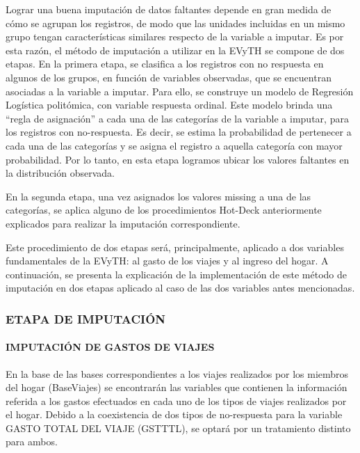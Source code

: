 \documentclass[
  openany]{book}
\begin{document}
Lograr una buena imputación de datos faltantes depende en gran medida de cómo se agrupan los registros, de modo que las unidades incluidas en un mismo grupo tengan características similares respecto de la variable a imputar. Es por esta razón, el método de imputación a utilizar en la EVyTH se compone de dos etapas. En la primera etapa, se clasifica a los registros con no respuesta en algunos de los grupos, en función de variables observadas, que se encuentran asociadas a la variable a imputar. Para ello, se construye un modelo de Regresión Logística politómica, con variable respuesta ordinal. Este modelo brinda una ``regla de asignación'' a cada una de las categorías de la variable a imputar, para los registros con no-respuesta. Es decir, se estima la probabilidad de pertenecer a cada una de las categorías y se asigna el registro a aquella categoría con mayor probabilidad. Por lo tanto, en esta etapa logramos ubicar los valores faltantes en la distribución observada.

En la segunda etapa, una vez asignados los valores missing a una de las categorías, se aplica alguno de los procedimientos Hot-Deck anteriormente explicados para realizar la imputación correspondiente.

Este procedimiento de dos etapas será, principalmente, aplicado a dos variables fundamentales de la EVyTH: al gasto de los viajes y al ingreso del hogar. A continuación, se presenta la explicación de la implementación de este método de imputación en dos etapas aplicado al caso de las dos variables antes mencionadas.

\hypertarget{etapa-de-imputaciuxf3n}{%
\subsubsection{\texorpdfstring{\textbf{ETAPA DE IMPUTACIÓN}}{ETAPA DE IMPUTACIÓN}}\label{etapa-de-imputaciuxf3n}}

\hypertarget{imputaciuxf3n-de-gastos-de-viajes}{%
\paragraph{\texorpdfstring{\textbf{IMPUTACIÓN DE GASTOS DE VIAJES}}{IMPUTACIÓN DE GASTOS DE VIAJES}}\label{imputaciuxf3n-de-gastos-de-viajes}}

En la base de las bases correspondientes a los viajes realizados por los miembros del hogar (BaseViajes) se encontrarán las variables que contienen la información referida a los gastos efectuados en cada uno de los tipos de viajes realizados por el hogar. Debido a la coexistencia de dos tipos de no-respuesta para la variable GASTO TOTAL DEL VIAJE (GSTTTL), se optará por un tratamiento distinto para ambos.
\end{document}
